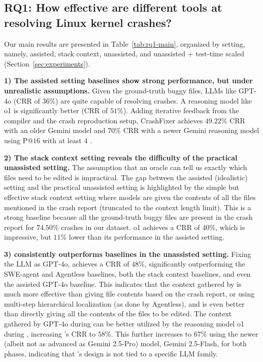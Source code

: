 \subsection{RQ1: How effective are different tools at resolving Linux kernel crashes?}%
\label{sec:rq1}

Our main results are presented in Table~\ref{tab:rq1-main}, organized by setting, namely, assisted, stack context, unassisted, and unassisted + test-time scaled (Section~\ref{sec:experiments}).

\noindent\textbf{1) The assisted setting baselines show strong performance, but under unrealistic assumptions.}
Given the ground-truth buggy files, LLMs like GPT-4o (CRR of $36\%$) are quite capable of resolving crashes.
A reasoning model like o1 is significantly better (CRR of $51\%$).
Adding iterative feedback from the compiler and the crash reproduction setup, CrashFixer achieves $49.22\%$ CRR with an older Gemini model and $70\%$ CRR with a newer Gemini reasoning model
using P@$16$ with at least $4$ \maxcalls{}.

\noindent\textbf{2) The stack context setting reveals the difficulty of the practical unassisted setting.}
The assumption that an oracle can tell us exactly which files need to be edited is impractical.
The gap between the assisted (idealistic) setting and the practical unassisted setting is highlighted by the simple but effective stack context setting
where models are given the contents of all the files mentioned in the crash report (truncated to the context length limit).
This is a strong baseline because all the ground-truth buggy files are present in the crash report for {$74.50\%$} crashes in our dataset.
o1 achieves a CRR of $40\%$, which is impressive, but $11\%$ lower than its performance in the assisted setting.

\noindent\textbf{3) \cresearcher{} consistently outperforms baselines in the unassisted setting.}
Fixing the LLM as GPT-4o, \cresearcher{} achieves a CRR of $48\%$, significantly outperforming the SWE-agent and Agentless baselines, both the stack context baselines, and even the assisted GPT-4o baseline.
This indicates that the context gathered by \cresearcher{} is much more effective than giving file contents based on the crash report, or using multi-step hierarchical localization (as done by Agentless), and is even better than directly giving all the contents of the files to be edited.
The context gathered by GPT-4o during \analysisphase{} can be better utilized by the reasoning model o1 during \synthesisphase{}, increasing \cresearcher{}'s CRR to $58\%$.
This further increases to $67\%$ using the newer (albeit not as advanced as Gemini 2.5-Pro) model, Gemini 2.5-Flash, for both phases, indicating that \cresearcher{}'s design is not tied to a specific LLM family.

